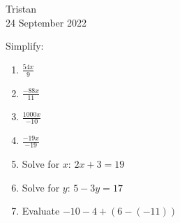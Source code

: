 \documentclass[14pt]{extarticle} %
\begin{document}
\hfill Tristan\\
\null\hfill 24 September 2022

\vspace{10mm}

Simplify:
\begin{enumerate}[label=\Alph*.), itemsep=\fill]
\item $\frac{54x}{9}$
\item $\frac{-88x}{11}$
\item $\frac{1000x}{-10}$
\item $\frac{-19x}{-19}$
\vfill\clearpage
\item Solve for $x$: $2x+3=19$
\item Solve for $y$: $5-3y=17$
\item  Evaluate $-10-4+(6-(-11))$
\vfill\end{enumerate}
\end{document}
